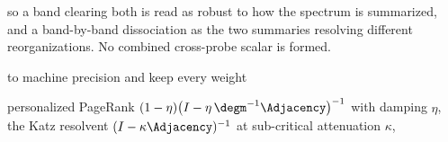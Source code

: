     so a band clearing both is read as robust to how the spectrum is summarized, and a band-by-band dissociation as the two summaries resolving different reorganizations. No combined cross-probe scalar is formed.

    to machine precision and keep every weight



    personalized PageRank \((1-\eta)\big(I-\eta\,\degm^{-1}\Adjacency\big)^{-1}\) with damping \(\eta\), the Katz resolvent \((I-\kappa\Adjacency)^{-1}\) at sub-critical attenuation \(\kappa\),


